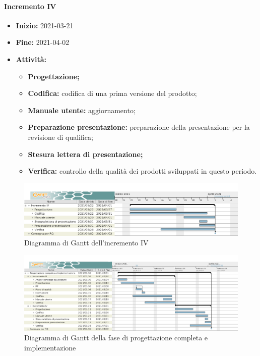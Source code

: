 \paragraph[Incremento IV]{Incremento IV}
\begin{itemize}
    \item [] \textbf{Inizio:} 2021-03-21
    \item [] \textbf{Fine:} 2021-04-02
    \item [] \textbf{Attività:}
          \begin{itemize}
              \item \textbf{Progettazione;}
              \item \textbf{Codifica:} codifica di una prima versione del prodotto;
              \item \textbf{Manuale utente:} aggiornamento;
              \item \textbf{Preparazione presentazione:} preparazione della presentazione per la revisione di qualifica;
              \item \textbf{Stesura lettera di presentazione;}
              \item \textbf{Verifica:} controllo della qualità dei prodotti sviluppati in questo periodo.
          \end{itemize}
\end{itemize}

\begin{figure}[H]
    \centering
    \includegraphics[width=1\linewidth]{res/images/pianificazione/incremento_4.png}
    \caption{Diagramma di Gantt dell'incremento IV}
    \label{fig:_Gantt incremento IV}
\end{figure}

\begin{figure}[H]
    \centering
    \includegraphics[width=1\linewidth]{res/images/pianificazione/progettazione_completa_e_implementazione.png}
    \caption{Diagramma di Gantt della fase di progettazione completa e implementazione}
    \label{fig:_Gantt progettazione completa e implementazione}
\end{figure}

